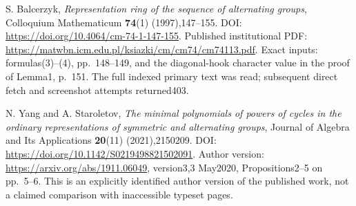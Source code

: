 S. Balcerzyk,
\emph{Representation ring of the sequence of alternating groups},
Colloquium Mathematicum \textbf{74}(1) (1997),147--155.
DOI: \url{https://doi.org/10.4064/cm-74-1-147-155}.
Published institutional PDF:
\url{https://matwbn.icm.edu.pl/ksiazki/cm/cm74/cm74113.pdf}.
Exact inputs: formulas(3)--(4), pp.~148--149, and the
diagonal-hook character value in the proof of Lemma1, p.~151.
The full indexed primary text was read; subsequent direct fetch
and screenshot attempts returned403.

N. Yang and A. Staroletov,
\emph{The minimal polynomials of powers of cycles in the ordinary
representations of symmetric and alternating groups},
Journal of Algebra and Its Applications \textbf{20}(11) (2021),2150209.
DOI: \url{https://doi.org/10.1142/S0219498821502091}.
Author version: \url{https://arxiv.org/abs/1911.06049},
version3,3 May2020, Propositions2--5 on pp.~5--6.
This is an explicitly identified author version of the published work,
not a claimed comparison with inaccessible typeset pages.
